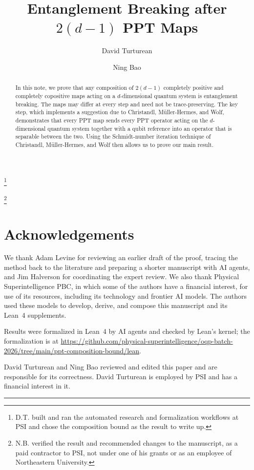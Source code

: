 \documentclass[aps,prl,reprint,superscriptaddress,longbibliography,raggedbottom]{revtex4-2}
\begin{document}
\title{Entanglement Breaking after \texorpdfstring{{\boldmath$2(d-1)$}}{2(d-1)} PPT Maps}
\author{David Turturean}\thanks{D.T. built and ran the automated research and formalization workflows at PSI and chose the composition bound as the result to write up.}
\author{Ning Bao}\thanks{N.B. verified the result and recommended changes to the manuscript, as a paid contractor to PSI, not under one of his grants or as an employee of Northeastern University.}

\begin{abstract}
In this note, we prove that any composition of $2(d-1)$ completely positive and completely
copositive maps acting on a $d$-dimensional quantum system is entanglement
breaking. The maps may differ at every step and need not be trace-preserving.
The key step, which implements a suggestion due to Christandl, M\"uller-Hermes, and Wolf, demonstrates that every PPT map sends every
PPT operator acting on the $d$-dimensional quantum system together with a qubit reference into an operator that is separable between the two. Using the
Schmidt-number iteration technique of Christandl, M\"uller-Hermes, and Wolf then
allows us to prove our main result.
\end{abstract}

\maketitle

{\raggedright\setlength{\parskip}{0.4\baselineskip}
\section*{Acknowledgements}

We thank Adam Levine for reviewing an earlier draft of the proof, tracing the method back to the literature and preparing a shorter manuscript with AI agents, and Jim Halverson for coordinating the expert review. We also thank Physical Superintelligence PBC, in which some of the authors have a financial interest, for use of its resources, including its technology and frontier AI models. The authors used these models to develop, derive, and compose this manuscript and its Lean~4 supplements.

Results were formalized in Lean~4 by AI agents and checked by Lean's kernel; the formalization is at \url{https://github.com/physical-superintelligence/oqp-batch-2026/tree/main/ppt-composition-bound/lean}.

David Turturean and Ning Bao reviewed and edited this paper and are responsible for its correctness. David Turturean is employed by PSI and has a financial interest in it.

\par}
\par\medskip\noindent\rule{\columnwidth}{0.4pt}\par\medskip
\end{document}
